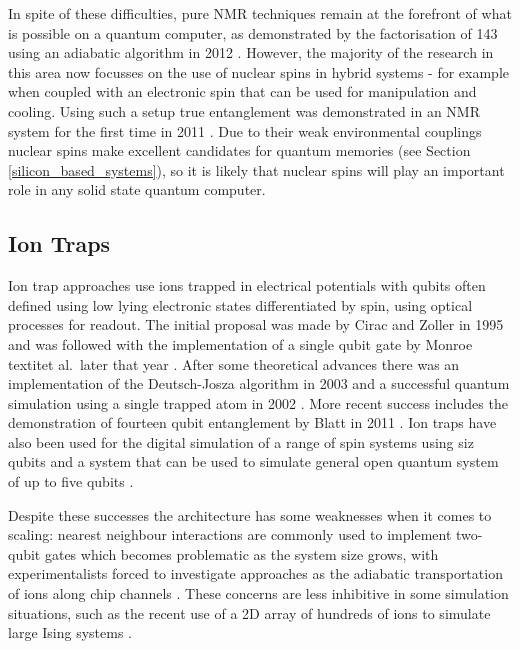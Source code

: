 In spite of these difficulties, pure NMR techniques remain at the forefront of what is possible on a quantum computer, as demonstrated by the factorisation of 143 using an adiabatic algorithm in 2012 \cite{nmr_143_factorization}. However, the majority of the research in this area now focusses on the use of nuclear spins in hybrid systems - for example when coupled with an electronic spin that can be used for manipulation and cooling. Using such a setup true entanglement was demonstrated in an NMR system for the first time in 2011 \cite{nmr_entanglement_11}. Due to their weak environmental couplings nuclear spins make excellent candidates for quantum memories (see Section \ref{silicon_based_systems}), so it is likely that nuclear spins will play an important role in any solid state quantum computer.

\subsection{Ion Traps}

Ion trap approaches use ions trapped in electrical potentials with qubits often defined using low lying electronic states differentiated by spin, using optical processes for readout. The initial proposal was made by Cirac and Zoller in 1995 \cite{cirac_zoller_ion_trap_proposal_95} and was followed with the implementation of a single qubit gate by Monroe textit{et al}.\ later that year \cite{monroe_ion_trap_gate_95}. After some theoretical advances  \cite{first_ion_trap_wineland_98} there was an implementation of the Deutsch-Josza algorithm in 2003 \cite{ion_trap_deutsch_jozsa_03} and a successful quantum simulation using a single trapped atom in 2002 \cite{ion_trap_simulator_02}. More recent success includes the demonstration of fourteen qubit entanglement by Blatt in 2011 \cite{ion_trap_14_qubits}. Ion traps have also been used for the digital simulation of a range of spin systems using siz qubits \cite{ion_trap_digital_simulator} and a system that can be used to simulate general open quantum system of up to five qubits \cite{ion_trap_simulator}.

Despite these successes the architecture has some weaknesses when it comes to scaling: nearest neighbour interactions are commonly used to implement two-qubit gates which becomes problematic as the system size grows, with experimentalists forced to investigate approaches as the adiabatic transportation of ions along chip channels \cite{ion_trap_on_chip}. These concerns are less inhibitive in some simulation situations, such as the recent use of a 2D array of hundreds of ions to simulate large Ising systems \cite{ion_trap_magnetism_simulator}.

